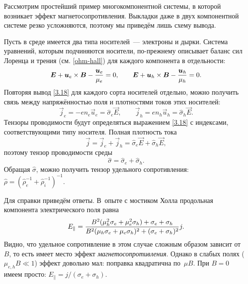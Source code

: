 \begin{lab:example}
Рассмотрим простейший пример многокомпонентной системы, в которой возникает
эффект магнетосопротивления. Выкладки даже в двух компонентной
системе резко усложняются, поэтому мы приведём лишь схему вывода.

Пусть в среде имеется два типа носителей~--- электроны и дырки. Система
уравнений, которым подчиняются носители, по-прежнему описывает баланс
сил Лоренца и трения (см. \eqref{ohm-hall}) для каждого компонента в
отдельности:
\begin{equation}
    \eqmark{two-component}
\vec{E}+\vec{u}_e\times \vec{B} - \frac{\vec{u}_e}{\mu_e} =0,\qquad
\vec{E}+\vec{u}_h\times \vec{B} - \frac{\vec{u}_h}{\mu_h} =0.
\end{equation}
Повторяя вывод \eqref{3.18} для каждого сорта носителей отдельно, можно
получить связь между напряжённостью поля и плотностями токов этих носителей:
\begin{equation}
    \vec{j}_e = -en_e \vec{u}_e = \hat{\sigma}_e \vec{E},\qquad
    \vec{j}_h = en_h \vec{u}_h = \hat{\sigma}_h \vec{E}.
\end{equation}
Тензоры проводимости будут определяться выражением \eqref{3.18} с индексами,
соответствующими типу носителя.
Полная плотность тока
\[
\vec{j} = \vec{j}_e + \vec{j}_h = \hat{\sigma}_e \vec{E} +
\hat{\sigma}_h \vec{E},
\]
поэтому тензор проводимости среды
\[
\hat{\sigma} = \hat{\sigma}_e + \hat{\sigma}_h.
\]
Обращая $\hat{\sigma}$, можно получить тензор удельного сопротивления:
$\hat{\rho}=
\left(\hat{\rho}_e^{-1}+\hat{\rho}_i^{-1}\right)^{-1}$.

Для справки приведём ответы.
В~опыте с мостиком Холла продольная компонента электрического поля равна
\begin{equation}
\eqmark{lambda_twocomponent}
E_{\parallel} = \frac{B^2 (\mu_h^2 \sigma_e + \mu_e^2 \sigma_h) + \sigma_e+
    \sigma_h}%
{ B^2 (\mu_h \sigma_e + \mu_e \sigma_h)^2 + (\sigma_e+\sigma_h)^2}
j.
\end{equation}
Видно, что удельное сопротивление в этом случае сложным образом
зависит от~$B$, то есть имеет место эффект \emph{магнетосопротивления}.
Однако в слабых полях ($\mu_{e,h}B \ll 1$) эффект довольно мал: поправка
квадратична по~$\mu B$. При $B=0$ имеем просто:
$E_{\parallel} = j/(\sigma_e+\sigma_h)$.


\end{lab:example}
